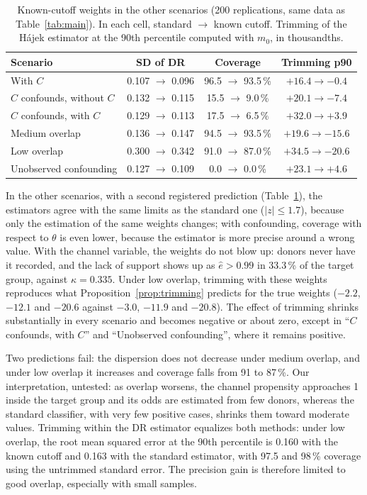 \documentclass[twoside,11pt]{article}
\theoremstyle{plain}
\theoremstyle{definition}
\begin{document}
\begin{table}[ht]
\centering\small
\caption{Known-cutoff weights in the other scenarios (200 replications, same data as Table~\ref{tab:main}). In each cell, standard $\to$ known cutoff. Trimming of the Hájek estimator at the 90th percentile computed with $m_0$, in thousandths.}\label{tab:cutoff-scenarios}
\begin{tabular}{@{}lccc@{}}
\toprule
Scenario & SD of DR & Coverage & Trimming p90 \\
\midrule
With $C$ & 0.107 $\to$ 0.096 & 96.5 $\to$ 93.5\,\% & $+16.4\to-0.4$ \\
$C$ confounds, without $C$ & 0.132 $\to$ 0.115 & 15.5 $\to$ 9.0\,\% & $+20.1\to-7.4$ \\
$C$ confounds, with $C$ & 0.129 $\to$ 0.113 & 17.5 $\to$ 6.5\,\% & $+32.0\to+3.9$ \\
Medium overlap & 0.136 $\to$ 0.147 & 94.5 $\to$ 93.5\,\% & $+19.6\to-15.6$ \\
Low overlap & 0.300 $\to$ 0.342 & 91.0 $\to$ 87.0\,\% & $+34.5\to-20.6$ \\
Unobserved confounding & 0.127 $\to$ 0.109 & 0.0 $\to$ 0.0\,\% & $+23.1\to+4.6$ \\
\bottomrule
\end{tabular}
\end{table}

In the other scenarios, with a second registered prediction (Table~\ref{tab:cutoff-scenarios}), the estimators agree with the same limits as the standard one ($|z|\le1.7$), because only the estimation of the same weights changes; with confounding, coverage with respect to $\theta$ is even lower, because the estimator is more precise around a wrong value. With the channel variable, the weights do not blow up: donors never have it recorded, and the lack of support shows up as $\hat e>0.99$ in 33.3\,\% of the target group, against $\kappa=0.335$. Under low overlap, trimming with these weights reproduces what Proposition~\ref{prop:trimming} predicts for the true weights ($-2.2$, $-12.1$ and $-20.6$ against $-3.0$, $-11.9$ and $-20.8$). The effect of trimming shrinks substantially in every scenario and becomes negative or about zero, except in ``$C$ confounds, with $C$'' and ``Unobserved confounding'', where it remains positive.

Two predictions fail: the dispersion does not decrease under medium overlap, and under low overlap it increases and coverage falls from 91 to 87\,\%. Our interpretation, untested: as overlap worsens, the channel propensity approaches 1 inside the target group and its odds are estimated from few donors, whereas the standard classifier, with very few positive cases, shrinks them toward moderate values. Trimming within the DR estimator equalizes both methods: under low overlap, the root mean squared error at the 90th percentile is 0.160 with the known cutoff and 0.163 with the standard estimator, with 97.5 and 98\,\% coverage using the untrimmed standard error. The precision gain is therefore limited to good overlap, especially with small samples.
\end{document}
